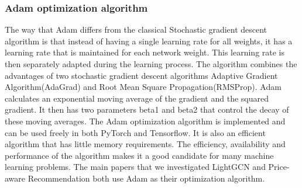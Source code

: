 \subsubsection{Adam optimization algorithm}
The way that Adam differs from the classical Stochastic gradient descent algorithm is that instead of having a single learning rate for all weights, it has a learning rate that is maintained for each network weight\cite{Adam}.
This learning rate is then separately adapted during the learning process.
The algorithm combines the advantages of two stochastic gradient descent algorithms Adaptive Gradient Algorithm(AdaGrad) and Root Mean Square Propagation(RMSProp).
Adam calculates an exponential moving average of the gradient and the squared gradient.
It then has two parameters beta1 and beta2 that control the decay of these moving averages.
The Adam optimization algorithm is implemented and can be used freely in both PyTorch and Tensorflow.
It is also an efficient algorithm that has little memory requirements.
The efficiency, availability and performance of the algorithm makes it a good candidate for many machine learning problems.
The main papers that we investigated LightGCN \cite{lightgcn} and Price-aware Recommendation\cite{Priceaware} both use Adam as their optimization algorithm.
